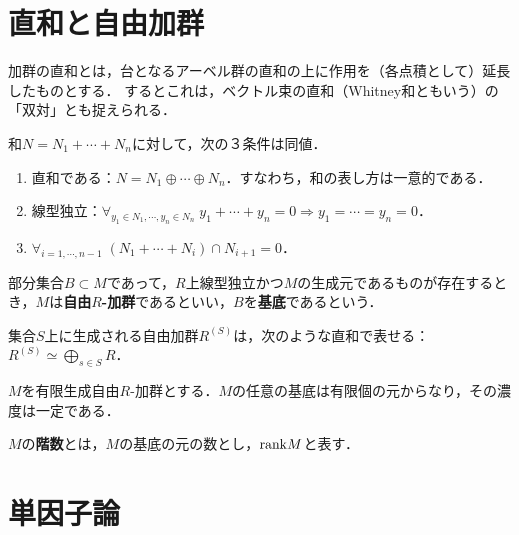 \documentclass[uplatex,dvipdfmx]{jsreport}
\begin{document}
\section{直和と自由加群}

\begin{tcolorbox}[colframe=ForestGreen, colback=ForestGreen!10!white,breakable,colbacktitle=ForestGreen!40!white,coltitle=black,fonttitle=\bfseries\sffamily,
title=]
    加群の直和とは，台となるアーベル群の直和の上に作用を（各点積として）延長したものとする．
    するとこれは，ベクトル束の直和（Whitney和ともいう）の「双対」とも捉えられる．
\end{tcolorbox}

\begin{proposition}
    和$N=N_1+\cdots+N_n$に対して，次の３条件は同値．
    \begin{enumerate}
        \item 直和である：$N=N_1\oplus\cdots\oplus N_n$．すなわち，和の表し方は一意的である．
        \item 線型独立：$\forall_{y_1\in N_1,\cdots,y_n\in N_n}\;y_1+\cdots+y_n=0\Rightarrow y_1=\cdots=y_n=0$．
        \item $\forall_{i=1,\cdots,n-1}\;(N_1+\cdots+N_i)\cap N_{i+1}=0$．
        \end{enumerate}
\end{proposition}

\begin{definition}
    部分集合$B\subset M$であって，$R$上線型独立かつ$M$の生成元であるものが存在するとき，$M$は\textbf{自由$R$-加群}であるといい，$B$を\textbf{基底}であるという．
\end{definition}

\begin{lemma}
    集合$S$上に生成される自由加群$R^{(S)}$は，次のような直和で表せる：
    $R^{(S)}\simeq\bigoplus_{s\in S}R$．
\end{lemma}

\begin{theorem}
    $M$を有限生成自由$R$-加群とする．$M$の任意の基底は有限個の元からなり，その濃度は一定である．
\end{theorem}

\begin{definition}
    $M$の\textbf{階数}とは，$M$の基底の元の数とし，$\mathrm{rank} M$と表す．
\end{definition}

\section{単因子論}
\end{document}
